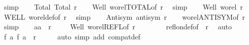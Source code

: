 \begin{isabellebody}
\ simp\isanewline
\ \ \isamarkupfalse%
\ Total{\isacharcolon}{\kern0pt}\ {\isachardoublequoteopen}Total\ r{\isachardoublequoteclose}\isanewline
\ \ \isamarkupfalse%
\ Well\ wo{\isacharunderscore}{\kern0pt}rel{\isachardot}{\kern0pt}TOTAL{\isacharbrackleft}{\kern0pt}of\ r{\isacharbrackright}{\kern0pt}\ \isamarkupfalse%
\ simp\isanewline
\ \ \isamarkupfalse%
\ Well{\isacharprime}{\kern0pt}{\isacharcolon}{\kern0pt}\ {\isachardoublequoteopen}wo{\isacharunderscore}{\kern0pt}rel\ r{\isacharprime}{\kern0pt}{\isachardoublequoteclose}\isanewline
\ \ \isamarkupfalse%
\ WELL{\isacharprime}{\kern0pt}\ wo{\isacharunderscore}{\kern0pt}rel{\isacharunderscore}{\kern0pt}def{\isacharbrackleft}{\kern0pt}of\ r{\isacharprime}{\kern0pt}{\isacharbrackright}{\kern0pt}\ \isamarkupfalse%
\ simp\isanewline
\ \ \isamarkupfalse%
\ Antisym{\isacharprime}{\kern0pt}{\isacharcolon}{\kern0pt}\ {\isachardoublequoteopen}antisym\ r{\isacharprime}{\kern0pt}{\isachardoublequoteclose}\isanewline
\ \ \isamarkupfalse%
\ wo{\isacharunderscore}{\kern0pt}rel{\isachardot}{\kern0pt}ANTISYM{\isacharbrackleft}{\kern0pt}of\ r{\isacharprime}{\kern0pt}{\isacharbrackright}{\kern0pt}\ \isamarkupfalse%
\ simp\isanewline
\ \ \isamarkupfalse%
\ {\isachardoublequoteopen}{\isacharparenleft}{\kern0pt}a{\isacharcomma}{\kern0pt}a{\isacharparenright}{\kern0pt}\ {\isasymin}\ r{\isachardoublequoteclose}\isanewline
\ \ \isamarkupfalse%
\ {\isacharasterisk}{\kern0pt}{\isacharasterisk}{\kern0pt}{\isacharasterisk}{\kern0pt}{\isacharasterisk}{\kern0pt}\ Well\ wo{\isacharunderscore}{\kern0pt}rel{\isachardot}{\kern0pt}REFL{\isacharbrackleft}{\kern0pt}of\ r{\isacharbrackright}{\kern0pt}\isanewline
\ \ \ \ \ \ \ \ refl{\isacharunderscore}{\kern0pt}on{\isacharunderscore}{\kern0pt}def{\isacharbrackleft}{\kern0pt}of\ {\isacharunderscore}{\kern0pt}\ r{\isacharbrackright}{\kern0pt}\ \isamarkupfalse%
\ auto\isanewline
\ \ \isamarkupfalse%
\ {\isachardoublequoteopen}{\isacharparenleft}{\kern0pt}f\ a{\isacharcomma}{\kern0pt}\ f\ a{\isacharparenright}{\kern0pt}\ {\isasymin}\ r{\isacharprime}{\kern0pt}{\isachardoublequoteclose}\isanewline
\ \ \isamarkupfalse%
\ {\isacharasterisk}{\kern0pt}{\isacharasterisk}{\kern0pt}\ \isamarkupfalse%
{\isacharparenleft}{\kern0pt}auto\ simp\ add{\isacharcolon}{\kern0pt}\ compat{\isacharunderscore}{\kern0pt}def{\isacharparenright}{\kern0pt}\isanewline
\ \ \isamarkupfalse%

\end{isabellebody}
